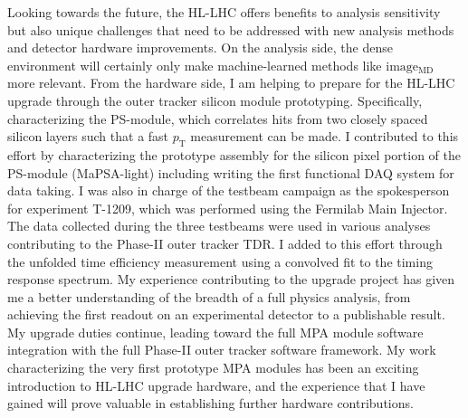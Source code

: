 \documentclass[12pt]{article}
\begin{document}
Looking towards the future, the HL-LHC offers benefits to analysis sensitivity
but also unique challenges that need to be addressed with new analysis methods
and detector hardware improvements.  On the analysis side, the dense environment
will certainly only make machine-learned methods like $\mathrm{image_{MD}}$ more
relevant.  From the hardware side, I am helping to prepare for the HL-LHC
upgrade through the outer tracker silicon module prototyping.
Specifically, characterizing the PS-module, which correlates hits from two closely
spaced silicon layers such that a fast $p_\mathrm{T}$ measurement can be made.  I contributed to
this effort by characterizing the prototype assembly for the silicon pixel portion
of the PS-module (MaPSA-light) including writing the first functional DAQ system for
data taking.  I was also in charge of the testbeam campaign as the spokesperson
for experiment T-1209, which was performed using the Fermilab Main Injector.
The data collected during the three testbeams were
used in various analyses contributing to the Phase-II outer tracker TDR.  I added to
this effort through the unfolded time efficiency measurement using a convolved
fit to the timing response spectrum.  My experience contributing to the upgrade
project has given me a better understanding of the breadth of a full physics analysis,
from achieving the first readout on an experimental detector to a publishable result.
My upgrade duties continue, leading toward the full MPA module software integration
with the full Phase-II outer tracker software framework.  My work characterizing
the very first prototype MPA modules has been an exciting introduction to HL-LHC
upgrade hardware, and the experience that I have gained will prove valuable in
establishing further hardware contributions.
\normalem
\end{document}
